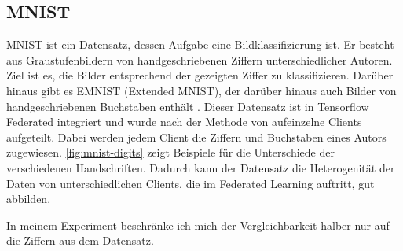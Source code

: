 \subsection{MNIST}
MNIST ist ein Datensatz, dessen Aufgabe eine Bildklassifizierung ist. Er besteht aus Graustufenbildern von handgeschriebenen Ziffern unterschiedlicher Autoren. Ziel ist es, die Bilder entsprechend der gezeigten Ziffer zu klassifizieren. Darüber hinaus gibt es EMNIST (Extended MNIST), der darüber hinaus auch Bilder von handgeschriebenen Buchstaben enthält \parencite{cohen:2017}. Dieser Datensatz ist in Tensorflow Federated integriert und wurde nach der Methode von \textcite{caldas:2018} aufeinzelne Clients aufgeteilt. Dabei werden jedem Client die Ziffern und Buchstaben eines Autors zugewiesen. \autoref{fig:mnist-digits} zeigt Beispiele für die Unterschiede der verschiedenen Handschriften. Dadurch kann der Datensatz die Heterogenität der Daten von unterschiedlichen Clients, die im Federated Learning auftritt, gut abbilden.

In meinem Experiment beschränke ich mich der Vergleichbarkeit halber nur auf die Ziffern aus dem Datensatz.

